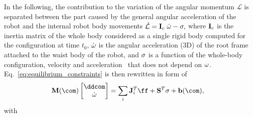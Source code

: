
In the following, the contribution to the variation of the angular momentum $\mathcal{L}$ is separated between the part caused by the general angular acceleration of the robot and the internal robot body movements $\dot{\bf\mathcal{L}} = {\bf I}_c \; \dot{\bf \omega} - {\bf\sigma}, $
where $ {\bf I}_c $ is the inertia matrix of the whole body considered as a single rigid body computed for the configuration at time $ t_0 $, $ \dot{\bf \omega} $ is the angular acceleration (3D) of the root frame attached to the waist body of the robot, and ${\bf\sigma}$ is a function of the whole-body configuration, velocity and acceleration~\cite{Orin:autorob:2013} that does not depend on ${\bf\omega}$.
%
Eq.~\ref{eq:equilibrium_constraints} is then rewritten in form of
\begin{equation}
  \label{eq:equilibrium_constraints_Ic}
   {\bf M}(\com)
   \begin{bmatrix}
     \ddcom \\ \dot{\bf \omega}
   \end{bmatrix}
   =   \sum_i {\bf J}_i^T \ff + {\bf S}^T {\bf\sigma} + {\bf b}(\com),
\end{equation}
with
